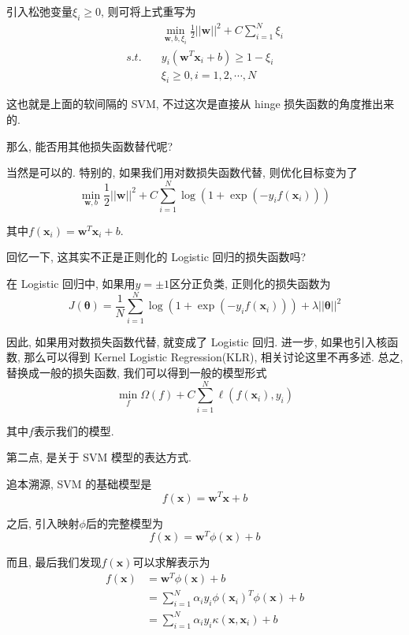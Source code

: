 \documentclass[a4paper,UTF8]{ctexart}
\theoremstyle{plain} \newtheorem{theorem}{定理}[section]
\theoremstyle{plain} \newtheorem{definition}{定义}[section]
\theoremstyle{plain} \newtheorem{lemma}{引理}[section]
\theoremstyle{plain} \newtheorem{proposition}{命题}[section]
\theoremstyle{plain} \newtheorem{example}{例}
\theoremstyle{plain} \newtheorem{remark}{注}
\theoremstyle{plain} \newtheorem{corollary}{推论}[section]
\begin{document}
引入松弛变量$\xi_{i} \geqslant 0$, 则可将上式重写为
\begin{align*}
& \min_{\bm{w}, b, \xi_i} \frac{1}{2} ||\bm{w}||^2 + C \sum_{i=1}^{N} \xi_i \\ 
s.t. \quad & y_{i} (\bm{w}^{T} \bm{x}_{i} + b) \geqslant 1 - \xi_{i} \\ 
\quad & \xi_{i} \geqslant 0, i = 1,2,\cdots,N
\end{align*}

这也就是上面的软间隔的 SVM, 不过这次是直接从 hinge 损失函数的角度推出来的.

那么, 能否用其他损失函数替代呢?

当然是可以的. 特别的, 如果我们用对数损失函数代替, 则优化目标变为了
\begin{equation*}
\min_{\bm{w}, b} \frac{1}{2} ||\bm{w}||^2 + C \sum_{i=1}^{N} \log \left( 1 + \exp (- y_i f(\bm{x}_i)) \right)
\end{equation*}

其中$f(\bm{x}_i) = \bm{w}^{T} \bm{x}_i + b$.

回忆一下, 这其实不正是正则化的 Logistic 回归的损失函数吗?

在 Logistic 回归中, 如果用$y = \pm 1$区分正负类, 正则化的损失函数为
\begin{equation*}
J(\bm{\theta}) = \frac{1}{N} \sum_{i=1}^{N} \log (1 + \exp (- y_i f(\bm{x}_i))) + \lambda ||\bm{\theta}||^2
\end{equation*}

因此, 如果用对数损失函数代替, 就变成了 Logistic 回归. 进一步, 如果也引入核函数, 那么可以得到 Kernel Logistic Regression(KLR), 相关讨论这里不再多述. 总之, 替换成一般的损失函数, 我们可以得到一般的模型形式
\begin{equation*}
\min_{f} \Omega(f) + C \sum_{i=1}^{N} \ell (f(\bm{x}_i), y_i)
\end{equation*}

其中$f$表示我们的模型.

第二点, 是关于 SVM 模型的表达方式.

追本溯源, SVM 的基础模型是
\begin{equation*}
f(\bm{x}) = \bm{w}^T \bm{x} + b
\end{equation*}

之后, 引入映射$\phi$后的完整模型为
\begin{equation*}
f(\bm{x}) = \bm{w}^T \phi(\bm{x}) + b
\end{equation*}

而且, 最后我们发现$f(\bm{x})$可以求解表示为
\begin{align*}
f(\bm{x}) & = \bm{w}^T \phi(\bm{x}) + b \\ 
& = \sum_{i=1}^{N} \alpha_i y_i \phi(\bm{x}_i)^T \phi(\bm{x}) + b \\ 
& = \sum_{i=1}^{N} \alpha_i y_i \kappa (\bm{x}, \bm{x}_i) + b
\end{align*}
\end{document}
